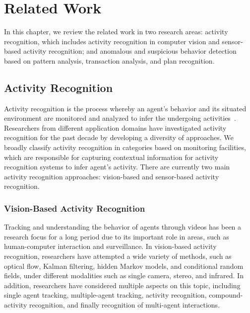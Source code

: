 
\chapter{Related Work}
\label{chap:related_work}


In this chapter, we review the related work in two research areas: activity recognition, which includes activity recognition in computer vision and sensor-based activity recognition; and anomalous and suspicious behavior detection based on pattern analysis, transaction analysis, and plan recognition.

%
%
\section{Activity Recognition}

Activity recognition is the process whereby an agent's behavior and its situated environment are monitored and analyzed to infer the undergoing activities~\citep{Chen2012}. Researchers from different application domains have investigated activity recognition for the past decade by developing a diversity of approaches. We broadly classify activity recognition in categories based on monitoring facilities, which are responsible for capturing contextual information for activity recognition systems to infer agent's activity. There are currently two main activity recognition approaches: vision-based and sensor-based activity recognition.

%
\subsection{Vision-Based Activity Recognition}

Tracking and understanding the behavior of agents through videos has been a research focus for a long period due to its important role in areas, such as human-computer interaction and surveillance. In vision-based activity recognition, researchers have attempted a wide variety of methods, such as optical flow, Kalman filtering, hidden Markov models, and conditional random fields, under different modalities such as single camera, stereo, and infrared. In addition, researchers have considered multiple aspects on this topic, including single agent tracking, multiple-agent tracking, activity recognition, compound-activity recognition, and finally recognition of multi-agent interactions.

